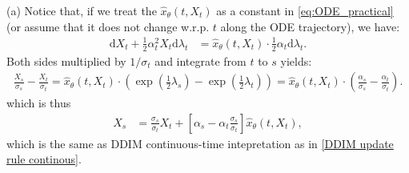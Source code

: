 \documentclass{article}
\theoremstyle{plain}
\theoremstyle{definition}
\theoremstyle{remark}
\begin{document}
(a) Notice that, if we treat the $\hat{x}_\theta\left(t,X_t\right)$ as a constant in \eqref{eq:ODE_practical} (or assume that it does not change w.r.p. $t$ along the ODE trajectory), we have:
\begin{equation}
\begin{aligned}
\mathrm{d}  X_t + \frac{1}{2}\alpha_t^2 X_t\mathrm{d} \lambda_t & =\hat{x}_\theta\left(t,X_t\right)\cdot\frac{1}{2} \alpha_t \mathrm{d} \lambda_t .
\end{aligned}
\end{equation}
Both sides multiplied by $1/\sigma_t$ and integrate from $t$ to $s$ yields:
\begin{equation}
\begin{aligned}
\frac{X_s}{\sigma_s}-\frac{X_t}{\sigma_t}=\hat{x}_\theta\left(t,X_t\right)\cdot\left(\exp(\frac{1}{2}\lambda_s)-\exp(\frac{1}{2}\lambda_t)\right)=\hat{x}_\theta\left(t,X_t\right)\cdot\left(\frac{\alpha_s}{\sigma_s}-\frac{\alpha_t}{\sigma_t}\right).
\end{aligned}
\end{equation}
which is thus
\begin{equation}
\begin{aligned}
X_s 
&=  \frac{\sigma_s}{\sigma_t}X_t+\left[\alpha_s-\alpha_t \frac{\sigma_s}{\sigma_t} \right] \hat{x}_\theta\left(t,X_t\right),
\end{aligned}
\end{equation}
which is the same as DDIM continuous-time intepretation as in \eqref{DDIM update rule continous}. 
\end{document}
